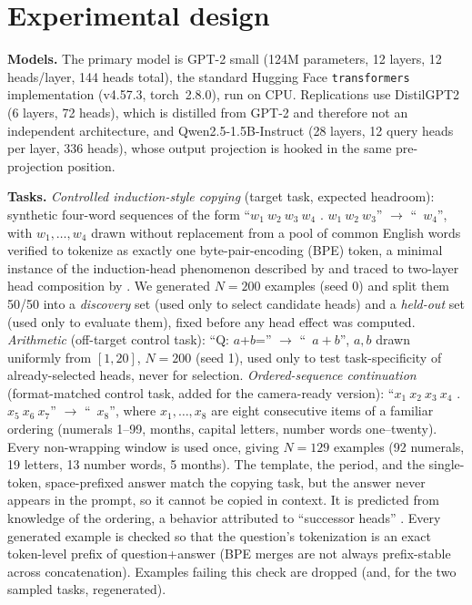 \documentclass{article}
\begin{document}
\section{Experimental design}
\label{sec:design}

\textbf{Models.} The primary model is GPT-2 small (124M parameters, 12
layers, 12 heads/layer, 144 heads total), the standard Hugging Face
\texttt{transformers} implementation (v4.57.3, torch~2.8.0), run on CPU.
Replications use DistilGPT2 (6 layers, 72 heads), which is distilled from
GPT-2 and therefore not an independent architecture, and
Qwen2.5-1.5B-Instruct \citep{qwen2025qwen25} (28 layers, 12 query heads
per layer, 336 heads), whose output projection is hooked in the same
pre-projection position.

\textbf{Tasks.} \emph{Controlled induction-style copying} (target task, expected
headroom): synthetic four-word sequences of the form ``$w_1\ w_2\ w_3\
w_4$ . $w_1\ w_2\ w_3$'' $\to$ ``\ $w_4$'', with $w_1,\dots,w_4$ drawn
without replacement from a pool of common English words verified to
tokenize as exactly one byte-pair-encoding (BPE) token, a minimal instance of the
induction-head phenomenon described by
\citet{olsson2022induction} and traced to two-layer head
composition by \citet{elhage2021framework}. We generated
$N=200$ examples (seed 0) and split them 50/50 into a \emph{discovery}
set (used only to select candidate heads) and a \emph{held-out} set
(used only to evaluate them), fixed before any head effect was computed.
\emph{Arithmetic} (off-target control task): ``Q: $a$+$b$='' $\to$ ``\
$a{+}b$'', $a,b$ drawn uniformly from $[1,20]$, $N=200$ (seed 1), used
only to test task-specificity of already-selected heads, never for
selection. \emph{Ordered-sequence continuation} (format-matched control
task, added for the camera-ready version): ``$x_1\ x_2\ x_3\ x_4$ .
$x_5\ x_6\ x_7$'' $\to$ ``\ $x_8$'', where $x_1,\dots,x_8$ are eight
consecutive items of a familiar ordering (numerals 1--99, months, capital
letters, number words one--twenty). Every non-wrapping window is used
once, giving $N=129$ examples (92 numerals, 19 letters, 13 number words,
5 months). The template, the period, and the single-token,
space-prefixed answer match the copying task, but the answer never
appears in the prompt, so it cannot be copied in context. It is
predicted from knowledge of the ordering, a behavior attributed to
``successor heads'' \citep{gould2024successor}. Every generated example is checked so that the question's
tokenization is an exact token-level prefix of question+answer (BPE
merges are not always prefix-stable across concatenation). Examples
failing this check are dropped (and, for the two sampled tasks,
regenerated).
\end{document}
